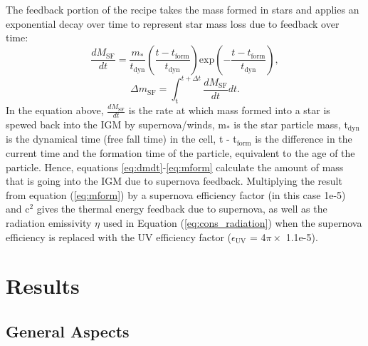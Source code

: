 \documentclass[letterpaper,10pt]{article}
\renewcommand{\(}{\left(}
\renewcommand{\)}{\right)}
\begin{document}
The feedback portion of the recipe takes the mass formed in stars and
applies an exponential decay over time to represent star mass loss due
to feedback over time:
\begin{equation}
\label{eq:dmdt}
  \frac{dM_\mathrm{SF}}{dt}= \frac{m_*}{t_\mathrm{dyn}}\(\frac{t-t_\mathrm{form}}{t_\mathrm{dyn}}\) \mathrm{exp}\(-\frac{t-t_\mathrm{form}}{t_\mathrm{dyn}}\),
\end{equation}
\begin{equation}
\label{eq:mform}
  \Delta m_\mathrm{SF}= \int^{t+\Delta t}_\mathrm{t} \frac{dM_\mathrm{SF}}{dt}dt.
\end{equation}
In the equation above, $\frac{dM_\mathrm{SF}}{dt}$ is the rate at
which mass formed into a star is spewed back into the IGM by supernova/winds, m$_*$ is
the star particle mass, t$_\mathrm{dyn}$ is the dynamical time 
(free fall time) in the cell, t - t$_\mathrm{form}$
is the difference in the current time and the formation time of the
particle, equivalent to the age of the particle.  Hence, equations
\eqref{eq:dmdt}-\eqref{eq:mform} calculate the amount of mass that is
going into the IGM due to supernova feedback.  Multiplying the result from equation
(\ref{eq:mform}) by a supernova efficiency factor (in this case 1e-5) and c$^2$ 
gives the thermal energy feedback due to supernova, as well as the radiation 
emissivity $\eta$ used in Equation (\ref{eq:cons_radiation}) when the supernova efficiency is replaced with the UV efficiency factor ($\epsilon_\mathrm{UV}$ = 4$\pi\times$ 1.1e-5).  


\section{Results}
\label{Results}
\subsection{General Aspects}
\end{document}
